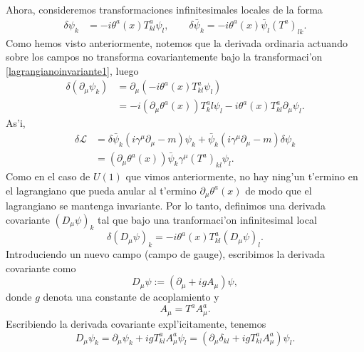 Ahora, consideremos transformaciones infinitesimales locales de la forma
\begin{equation}
\begin{aligned} \label{lagrangianoinvariante1}
\delta \psi_k &= -i\theta^a(x) T^{a}_{kl} \psi_l, \qquad \delta \bar{\psi}_k=-i\theta^a(x) \bar{\psi}_l (T^{a})_{lk}.
\end{aligned}
\end{equation}
Como hemos visto anteriormente, notemos que la derivada ordinaria actuando sobre los campos no transforma covariantemente bajo la  transformaci'on \eqref{lagrangianoinvariante1}, luego
\begin{equation}
\begin{aligned}
\delta(\partial_\mu \psi_k)&= \partial_\mu (-i\theta^a(x)T^a_{kl}\psi_l) \\
&= -i(\partial_\mu \theta^a(x))T^a_kl \psi_l-i\theta^a(x)T^a_{kl}\partial_\mu \psi_l.
\end{aligned}
\end{equation}
As'i,
\begin{equation}
\begin{aligned}
\delta\mathcal{L}&=\delta \bar\psi_k (i\gamma^\mu \partial_\mu-m)\psi_k+\bar{\psi}_k(i\gamma^\mu\partial_\mu-m)\delta\psi_k \\
&= (\partial_\mu \theta^a(x))\bar{\psi}_k\gamma^\mu (T^a)_{kl}\psi_l.
\end{aligned}
\end{equation}
Como en el caso de $U(1)$ que vimos anteriormente, no hay ning'un t'ermino en el lagrangiano que pueda anular al t'ermino $\partial_\mu \theta^a(x)$ de modo que el lagrangiano se mantenga invariante. Por lo tanto, definimos una derivada covariante $(D_\mu \psi)_k$  tal que bajo una tranformaci'on infinitesimal local
\begin{equation}
\delta(D_\mu \psi)_k=-i\theta^a(x)T^a_{kl}(D_\mu \psi)_l.
\end{equation}
Introduciendo un nuevo campo (campo de gauge), escribimos la derivada covariante como
\begin{equation}
D_\mu \psi := (\partial_\mu +igA_\mu)\psi,
\end{equation}
donde $g$ denota una constante de acoplamiento y 
\begin{equation} \label{campoA}
A_\mu =T^a A^a_\mu.
\end{equation}
Escribiendo la derivada covariante expl'icitamente, tenemos
\begin{equation} \label{derivadacovariante2}
D_\mu \psi_k =\partial_\mu \psi_k +ig T^a_{kl} A^a_\mu \psi_l=(\partial_\mu \delta_{kl}+igT^a_{kl}A^a_\mu)\psi_l.
\end{equation}
